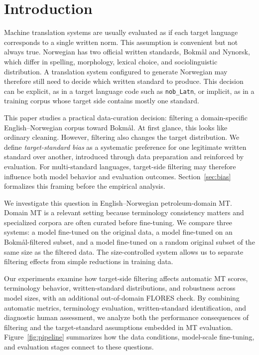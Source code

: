 \documentclass[11pt]{article}
\newcommand{\nb}{Bokm{\aa}l}
\newcommand{\nn}{Nynorsk}
\begin{document}
\section{Introduction}

Machine translation systems are usually evaluated as if each target language corresponds to a single written norm. This assumption is convenient but not always true. Norwegian has two official written standards, \nb{} and \nn{}, which differ in spelling, morphology, lexical choice, and sociolinguistic distribution. A translation system configured to generate Norwegian may therefore still need to decide which written standard to produce. This decision can be explicit, as in a target language code such as \texttt{nob\_Latn}, or implicit, as in a training corpus whose target side contains mostly one standard.

This paper studies a practical data-curation decision: filtering a domain-specific English--Norwegian corpus toward \nb{}. At first glance, this looks like ordinary cleaning. However, filtering also changes the target distribution. We define \emph{target-standard bias} as a systematic preference for one legitimate written standard over another, introduced through data preparation and reinforced by evaluation. For multi-standard languages, target-side filtering may therefore influence both model behavior and evaluation outcomes. Section~\ref{sec:bias} formalizes this framing before the empirical analysis.

We investigate this question in English--Norwegian petroleum-domain MT. Domain MT is a relevant setting because terminology consistency matters and specialized corpora are often curated before fine-tuning. We compare three systems: a model fine-tuned on the original data, a model fine-tuned on an \nb{}-filtered subset, and a model fine-tuned on a random original subset of the same size as the filtered data. The size-controlled system allows us to separate filtering effects from simple reductions in training data.

Our experiments examine how target-side filtering affects automatic MT scores, terminology behavior, written-standard distributions, and robustness across model sizes, with an additional out-of-domain FLORES check. By combining automatic metrics, terminology evaluation, written-standard identification, and diagnostic human assessment, we analyze both the performance consequences of filtering and the target-standard assumptions embedded in MT evaluation. Figure~\ref{fig:pipeline} summarizes how the data conditions, model-scale fine-tuning, and evaluation stages connect to these questions.
\end{document}
